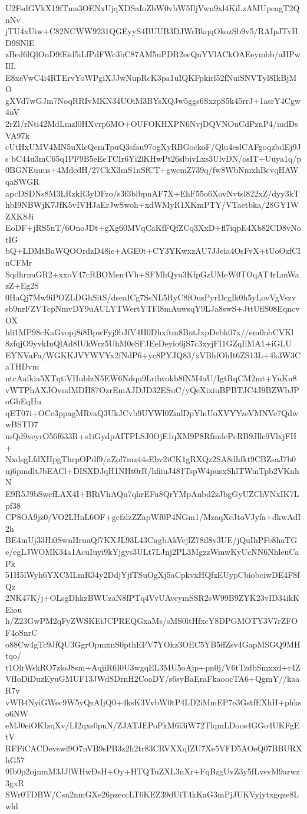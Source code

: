 U2FsdGVkX19fTms3OENxUjqXDSaIoZbW0vbW5IljVwn9xl4KiLzAMUpeagT2QnNv
jTU4xUiw+C82NCWW9231QGEyyS4BUUB3DJWrBkqqOkozSb9v5/RAIpJTvHD9SNlE
zBed6lQlOnD9fEid5iLfPdFWc3bC87AM5uPDR2eeQnYVlACkOAEeymbb/aHPwIlL
E8xeVwC4i4RTErvYoWPgiXJJwNupRcK3pa1uIQKFpkirl52fNuiSNVTyl8IkBjMO
gXVd7wGJm7NoqRRIvMKN34UOiM3BYsXQJw5ggs6SxzpS5k45rrJ+1asrY4Cgw4nV
2rZl/rNti42MdLmzl0HXvrp6MO+OUFOKHXPN6NvjDQVNOuCdPznP4/iudDsVA97k
cUtHxUMV4MN5uXlcQemTpuQ3sfau97ogXyRBGockoF/Qlu4eslCAFgoqzbdEj9Js
bC44u3mC65q1PF9B5eEeTCIr6Yi2lKHwPt26slbivLxs3UlvDN/osIT+Uuya1q/p
0BGNEuuus+4MdedH/27CkX3mS1nSfCT+gwcmZ739q/fw8WbNmxhBcvqHAWqaSWGR
apcDSDNs8M3LRzkR3yDFzo/s3f3blbpnAF7X+EhF55o6XovNvtsl822xZ/dyy3kT
hbI9NBWjK7JfK5vIVHJaErJwSwoh+xdWMyR1XKmPTY/VTaetbka/28GY1WZXK8Ji
EoDF+jRS5nT/6OnoJDt+gXg60MVqCaKfFQfZCq3XxD+fl7iqpE4Xb82CD8vNotIG
bQ+LDMtBaWQOOrdzD48ic+AGE0t+CY3YKwxzAU7JJeia4OsFvX+tUoOzfCInCFMr
SqdhrnuGR2+xxoV47cRBOMen4Vh+SFMhQyu3KfpGzUMeW0TOqAT4rLmWazZ+Eg2S
0HaQj7Mw9iPOZLDGhSitS/dseaICg7SsNL5RyC8fOusPyrDcgIk0h5yLovVgVszv
sb9nrFZVTcpNmvDY9uAULYTWertYTFl8mAuwsqY9LJa8swS+JttUflS08EqncvOX
hli1MP98cKaGvopj8i8BpwFyj9bJfV4H0Dhxftm8BntJxpDebk07x//em0nbCVKl
8zfqjO9yvkInQlAd8IUkWrz5UhM0eSFJEeDeyio6jS7c3xyjFI1GZqIlMA1+iGLU
EYNVaFa/WGKKJVYWVYx2fNdP6+yc8PYJQ83/xVBhfOhIt6ZS13L+4k3W3CaTHDvm
ntcAafkia5XTqtiVHublzN5EW6Ndqu9Lribvokb8fN5I4aU/IgtRqCM2mt+YuKn8
vWTPhAXJOvndMDH87OzrEmAJDJD32ESuC/yQeXixiuBPBTJC4J9BZWbJPoGbEqHu
qET07i+OCc3ppagMRvaQ3UkJCvb9UYWl0ZmlDpYlnUoXVYYzeVMNVe7QdwwBSTD7
mQd9veyrO56f633R+s1iGydpAITPLSJ0OjE1qXM9P8RfmdcPcRB9Jllc9VlxjFH+
NxdsgLfdXHpgThrpOPdf9/aZol7mz44sEbv2iCK1gRXQz2SA8dhfkt9CBZsaJ7b0
nj6pmdltJbEACl+DISXDJqH1NHt0rR/hfiiuJ481TspW4pusxShlTWmTpb2VKnhN
E9R5J9bSwefLAX4I+BRiVhAQu7qhrEFu8QrYMpAnbd2zJbgGyUZChVNxIK7Lpf38
CP8OA9jz0/VO2LHnL6OF+gcfzlzZZapWf0P4NGm1/MzaqXeJtoVJyfa+dkwAdI2h
BE4mUj33Hi0SwnHruaQf7KXJL93L43CngbAkVejlZ78il8v3UE/jQuIhPFe8haTG
e/egLJWOMK34a1AcuIuyi9kYjgys3ULt7LJnj2PL3MgzzWmwKyUcNN6NhleuCaPk
51H5lWyh6YXCMLmR34y2DdjYjfTSuOgXj5aCpkvxHQfzEUypCbiobciwDE4F8fQz
2NK47K/j+OLsgDhkzBWUzaN8fPTq4VvUAveymSSR2sW99B9ZYK23vID34ikKEiou
h/Z23GwPM2qFyZWSKEiJCPREQGxaMs/sMS0ltHfxcY8DPGMOTY3V7rZFOF4oSnrC
o88Cw4gTc9JfQU3GgrOpmxnS0pthEFV7YOkz3OEC5YB5ffZsv4GapMSGQ9MHtqo/
t1OlrWskRO7zloJ8sm+AqjiR6I0U3wgqEL3MU5oAjp+pn0j/V6tTzdbSmxxd+r4Z
VfIoDiDuzEyuGMUF13JWdSDrnH2CoaDY/s6syBaEraFkaoocTA6+QgmY//kaaR7v
vWB4NyiGWec9W5yQzAIjQ0+4ksK3VvbW0tP4LD2iMmEP7e3GstfEXhH+phkso6NW
eMJ0eiOKIzqXv/LI2qxs0pnN/ZJATJEPoPkM6l3iW72TlqmLDoos4GGo4UKFgEtV
RFFiCACDevswi9O7nVB9sPB3z2h2tr83CRVXXqIZU7Xe5VFD5AOeQ07BBURXhG57
9Ib0p2ojnmM3JJlWHwDsH+Oy+HTQTuZXL3nXr+FqBzgUvZ3y5fLvsvM9arwz3gxR
SWr0TDBW/Csn2nmGXe26pzeccLT6KEZ39dUiT4kKaG3mPjJUKVyjytxgqze8Lwld
